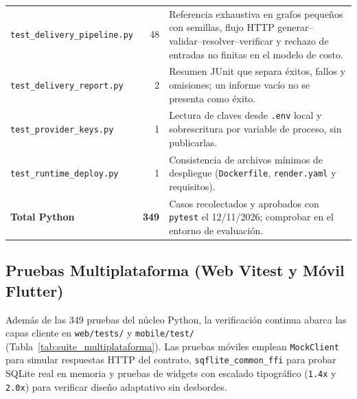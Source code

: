 \begin{table}[H]
\begin{tabularx}{\textwidth}{@{}>{\raggedright\arraybackslash}p{5.3cm} r >{\raggedright\arraybackslash}X@{}}
        \texttt{test\_delivery\_pipeline.py} & 48 & Referencia exhaustiva en grafos pequeños con semillas, flujo HTTP generar--validar--resolver--verificar y rechazo de entradas no finitas en el modelo de costo. \\
        \texttt{test\_delivery\_report.py} & 2 & Resumen JUnit que separa éxitos, fallos y omisiones; un informe vacío no se presenta como éxito. \\
        \texttt{test\_provider\_keys.py} & 1 & Lectura de claves desde \texttt{.env} local y sobrescritura por variable de proceso, sin publicarlas. \\
        \texttt{test\_runtime\_deploy.py} & 1 & Consistencia de archivos mínimos de despliegue (\texttt{Dockerfile}, \texttt{render.yaml} y requisitos). \\
        \midrule
        \textbf{Total Python} & \textbf{349} & Casos recolectados y aprobados con \texttt{pytest} el 12/11/2026; comprobar en el entorno de evaluación. \\
        \bottomrule
    \end{tabularx}
\end{table}

\subsection{Pruebas Multiplataforma (Web Vitest y Móvil Flutter)}
Además de las 349 pruebas del núcleo Python, la verificación continua abarca las capas cliente en \texttt{web/tests/} y \texttt{mobile/test/} (Tabla~\ref{tab:suite_multiplataforma}). Las pruebas móviles emplean \texttt{MockClient} para simular respuestas HTTP del contrato, \texttt{sqflite\_common\_ffi} para probar SQLite real en memoria y pruebas de widgets con escalado tipográfico (\texttt{1.4x} y \texttt{2.0x}) para verificar diseño adaptativo sin desbordes.

